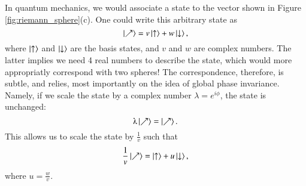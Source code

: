 In quantum mechanics, we would associate a state to the vector shown in Figure \ref{fig:riemann_sphere}(c). One could write this arbitrary state as
\begin{equation} \label{eq:qubit_state}
    \ket{\nearrow} = v \ket{\uparrow} + w \ket{\downarrow},
\end{equation}
where $\ket{\uparrow}$ and $\ket{\downarrow}$ are the basis states, and $v$ and $w$ are complex numbers. The latter implies we need 4 real numbers to describe the state, which would more appropriatly correspond with two spheres! The correspondence, therefore, is subtle, and relies, most importantly on the idea of global phase invariance. Namely, if we scale the state by a complex number $\lambda = e^{i \phi}$, the state is unchanged:
\begin{equation} \label{eq:global_phase}
    \lambda \ket{\nearrow} =  \ket{\nearrow} .
\end{equation}
This allows us to scale the state by $\frac{1}{v}$ such that 
\begin{equation} \label{eq:qubit_state_normalized}
    \frac{1}{v} \ket{\nearrow} = \ket{\uparrow} + u \ket{\downarrow},
\end{equation}
where $u = \frac{w}{v}$. 




